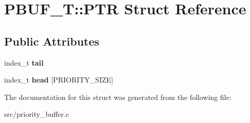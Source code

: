 \hypertarget{structPBUF__T_1_1PTR}{}\section{P\+B\+U\+F\+\_\+T\+:\+:P\+TR Struct Reference}
\label{structPBUF__T_1_1PTR}
\subsection*{Public Attributes}
\begin{DoxyCompactItemize}
\item 
\mbox{\label{structPBUF__T_1_1PTR_ad30411383d87fea3c1e525e32d765c9c}} 
index\+\_\+t {\bfseries tail}
\item 
\mbox{\label{structPBUF__T_1_1PTR_a8f68df3abc824c389ee598233f4674ba}} 
index\+\_\+t {\bfseries head} \mbox{[}P\+R\+I\+O\+R\+I\+T\+Y\+\_\+\+S\+I\+ZE\mbox{]}
\end{DoxyCompactItemize}


The documentation for this struct was generated from the following file\+:\begin{DoxyCompactItemize}
\item 
src/priority\+\_\+buffer.\+c\end{DoxyCompactItemize}
